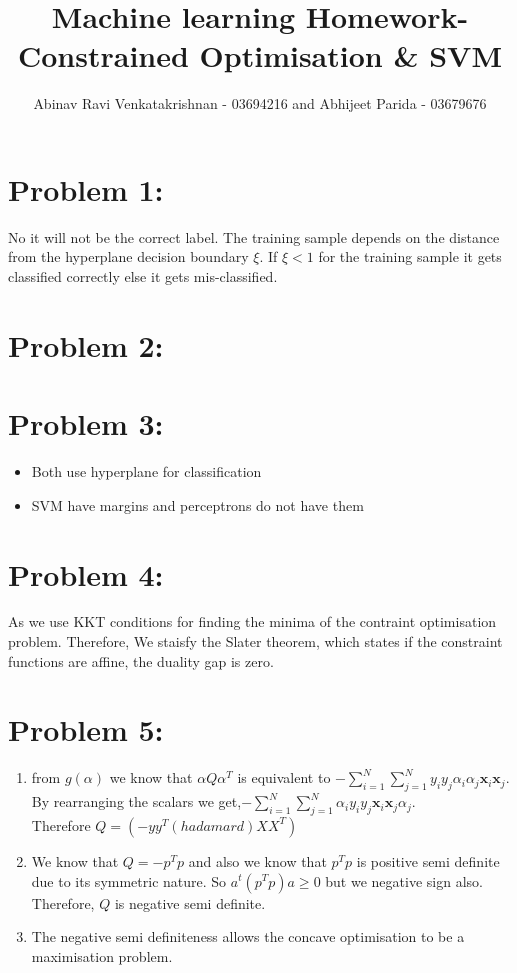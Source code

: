 \documentclass[5pt,a4paper]{article}
\begin{document}
	\title{Machine learning Homework- Constrained Optimisation \& SVM }
	\author{Abinav Ravi Venkatakrishnan - 03694216 and Abhijeet Parida - 03679676}
	\maketitle
	\section*{Problem 1:}
	No it will not be the correct label. The training sample depends on the distance from the hyperplane decision boundary $\xi$. If $ \xi < 1 $ for the training sample it gets classified correctly else it gets mis-classified.
	
	\section*{Problem 2:}
	
	
	\section*{Problem 3:}
	\begin{itemize}
		\item Both use hyperplane for classification
		\item SVM have margins and perceptrons do not have them
	\end{itemize}
	
	\section*{Problem 4:}
	As we use KKT conditions for finding the minima of the contraint optimisation problem. Therefore, We staisfy the Slater theorem, which states  if the constraint 	functions are affine, the duality gap is zero.
	\section*{Problem 5:}
	\begin{enumerate}
		\item from $g(\alpha)$ we know that $\alpha Q\alpha^T$ is equivalent to $-\sum_{i=1}^{N}\sum_{j=1}^{N} y_i y_j \alpha_i \alpha_j \textbf{x}_i \textbf{x}_j$. By rearranging the scalars we get,$-\sum_{i=1}^{N}\sum_{j=1}^{N}\alpha_i  y_i y_j  \textbf{x}_i \textbf{x}_j \alpha_j$. \\Therefore $Q= (-yy^T(hadamard)XX^T)$		\item We know that $Q=-p^Tp$ and also we know that $p^Tp$ is positive semi definite due to its symmetric nature. So $a^t (p^Tp)a \geq 0$ but we negative sign also. Therefore, $Q$ is negative semi definite.
		\item The negative semi definiteness allows the concave optimisation to be a maximisation problem. 
	\end{enumerate}
	
\end{document}
